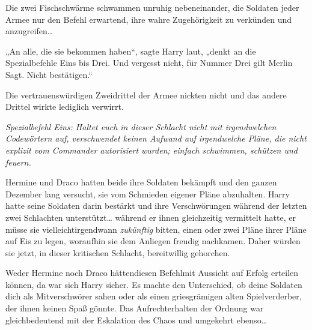 Die zwei Fischschwärme schwammen unruhig nebeneinander, die Soldaten jeder Armee nur den Befehl erwartend, ihre wahre Zugehörigkeit zu verkünden und anzugreifen…

„An alle, die sie bekommen haben“, sagte Harry laut, „denkt an die Spezialbefehle Eins bis Drei. Und vergesst nicht, für Nummer Drei gilt Merlin Sagt. Nicht bestätigen.“

Die vertrauenswürdigen Zweidrittel der Armee nickten nicht und das andere Drittel wirkte lediglich verwirrt.

\emph{Spezialbefehl Eins: Haltet euch in dieser Schlacht nicht mit irgendwelchen Codewörtern auf, verschwendet keinen Aufwand auf irgendwelche Pläne, die nicht explizit vom Commander autorisiert wurden; einfach schwimmen, schützen und feuern.}

Hermine und Draco hatten beide ihre Soldaten bekämpft und den ganzen Dezember lang versucht, sie vom Schmieden eigener Pläne abzuhalten. Harry hatte seine Soldaten darin bestärkt und ihre Verschwörungen während der letzten zwei Schlachten unterstützt… während er ihnen gleichzeitig vermittelt hatte, er müsse sie vielleichtirgendwann \emph{zukünftig} bitten, einen oder zwei Pläne ihrer Pläne auf Eis zu legen, woraufhin sie dem Anliegen freudig nachkamen. Daher würden sie jetzt, in dieser kritischen Schlacht, bereitwillig gehorchen.

Weder Hermine noch Draco hättendiesen Befehlmit Aussicht auf Erfolg erteilen können, da war sich Harry sicher. Es machte den Unterschied, ob deine Soldaten dich als Mitverschwörer sahen oder als einen griesgrämigen alten Spielverderber, der ihnen keinen Spaß gönnte. Das Aufrechterhalten der Ordnung war gleichbedeutend mit der Eskalation des Chaos und umgekehrt ebenso…

